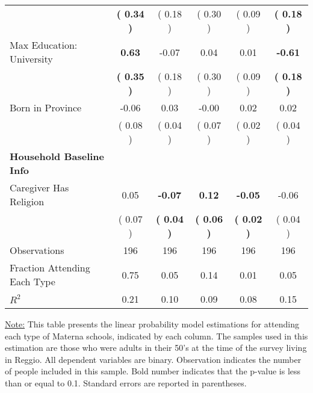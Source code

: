 \begin{table}[H]
{\begin{tabular}{lccccc}
\quad  & \textbf{(     0.34 )} & (     0.18 )  & (     0.30 )  & (     0.09 ) & \textbf{(     0.18 )} \\
\quad Max Education: University & \textbf{     0.63} &     -0.07 &      0.04 &      0.01 & \textbf{    -0.61} \\
\quad  & \textbf{(     0.35 )} & (     0.18 )  & (     0.30 )  & (     0.09 ) & \textbf{(     0.18 )} \\
\quad Born in Province &     -0.06 &      0.03 &     -0.00 &      0.02 &      0.02 \\
\quad  & (     0.08 ) & (     0.04 )  & (     0.07 )  & (     0.02 ) & (     0.04 ) \\
\midrule
\textbf{Household Baseline Info} \\
\quad Caregiver Has Religion &      0.05 & \textbf{    -0.07} & \textbf{     0.12} & \textbf{    -0.05} &     -0.06 \\
\quad  & (     0.07 ) & \textbf{(     0.04 )}  & \textbf{(     0.06 )}  & \textbf{(     0.02 )} & (     0.04 ) \\
\midrule
Observations & 196 & 196 & 196 & 196 & 196 \\
Fraction Attending Each Type &      0.75 &      0.05 &      0.14 &      0.01 &      0.05 \\
\midrule
$ R^2$ &      0.21 &      0.10 &      0.09 &      0.08 &      0.15 \\
\bottomrule
\end{tabular}}
\end{table}
\begin{scriptsize}
\noindent\underline{Note:} This table presents the linear probability model estimations for attending each type of Materna schools, indicated by each column. The samples used in this estimation are those who were adults in their 50's at the time of the survey living in Reggio. All dependent variables are binary. Observation indicates the number of people included in this sample. Bold number indicates that the p-value is less than or equal to 0.1. Standard errors are reported in parentheses.
\end{scriptsize}
